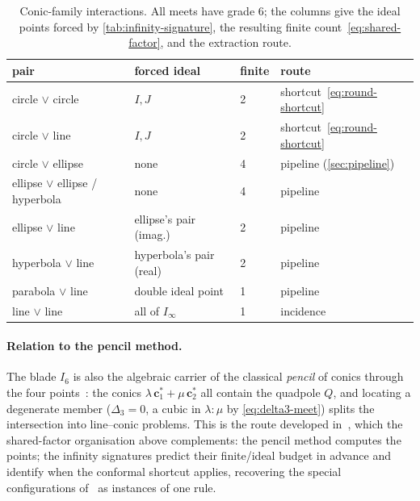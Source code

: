 \documentclass{birkjour}
\theoremstyle{definition}
\theoremstyle{remark}
\newcommand{\Iinf}{I_\infty}
\newcommand{\meet}{\vee}
\begin{document}
\begin{table}[H]
\centering
\caption{Conic-family interactions. All meets have grade $6$; the columns
give the ideal points forced by \cref{tab:infinity-signature}, the resulting
finite count~\eqref{eq:shared-factor}, and the extraction route.}
\label{tab:interaction}
\small
\begin{tabular}{@{}llll@{}}
\toprule
pair & forced ideal & finite & route \\
\midrule
circle $\meet$ circle    & $I,J$ & 2 & shortcut~\eqref{eq:round-shortcut} \\
circle $\meet$ line      & $I,J$ & 2 & shortcut~\eqref{eq:round-shortcut} \\
circle $\meet$ ellipse   & none  & 4 & pipeline (\cref{sec:pipeline}) \\
ellipse $\meet$ ellipse / hyperbola & none & 4 & pipeline \\
ellipse $\meet$ line     & ellipse's pair (imag.) & 2 & pipeline \\
hyperbola $\meet$ line   & hyperbola's pair (real) & 2 & pipeline \\
parabola $\meet$ line    & double ideal point & 1 & pipeline \\
line $\meet$ line        & all of $\Iinf$ & 1 & incidence \\
\bottomrule
\end{tabular}
\end{table}

\paragraph{Relation to the pencil method.}
The blade $I_6$ is also the algebraic carrier of the classical \emph{pencil}
of conics through the four points~\cite{halsted_synthetic_1906}: the conics
$\lambda\,\mathbf{c}_1^{*}+\mu\,\mathbf{c}_2^{*}$ all contain the quadpole
$Q$, and locating a degenerate member ($\Delta_3=0$, a cubic in
$\lambda:\mu$ by \cref{eq:delta3-meet}) splits the intersection into
line--conic problems. This is the route developed
in~\cite{chomicki_intersection_2023}, which the shared-factor organisation
above complements: the pencil method computes the points; the infinity
signatures predict their finite/ideal budget in advance and identify when the
conformal shortcut applies, recovering the special configurations
of~\cite{byrtus_specific_2021} as instances of one rule.

\end{document}
